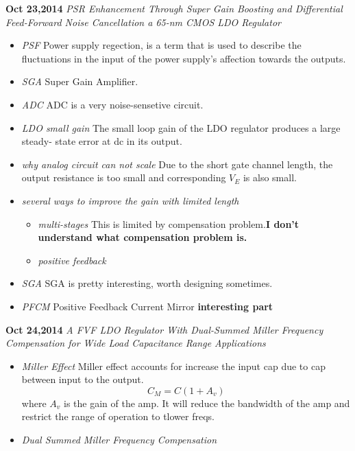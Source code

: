 \documentclass[]{article}
\begin{document}
\noindent \textbf{Oct 23,2014}
\textit{PSR Enhancement Through Super Gain Boosting and Differential Feed-Forward Noise Cancellation
        a 65-nm CMOS LDO Regulator}
\indent		\begin{itemize}
                \item \textit{PSF} Power supply regection, is a term that is used to describe the fluctuations
                        in the input of the power supply's affection towards the outputs. 
                \item \textit{SGA} Super Gain Amplifier.
                \item \textit{ADC} ADC is a very noise-sensetive circuit.
                \item \textit{LDO small gain} The small loop gain of the LDO regulator produces a large steady-
                        state error at dc in its output.
                \item \textit{why analog circuit can not scale} Due to the short gate channel length, the output
                        resistance is too small and corresponding $V_{E}$ is also small.
                \item \textit{several ways to improve the gain with limited length} 
                        \begin{itemize}
                            \item \textit{multi-stages} This is limited by compensation problem.\textbf{I don't 
                                understand what compensation problem is. }
                            \item \textit{positive feedback}
                        \end{itemize}
                \item \textit{SGA} SGA is pretty interesting, worth designing sometimes.
                \item \textit{PFCM} Positive Feedback Current Mirror \textbf{interesting part}
            \end{itemize}

\noindent \textbf{Oct 24,2014}
\textit{A FVF LDO Regulator With Dual-Summed Miller Frequency Compensation for Wide Load Capacitance 
        Range Applications}
\indent		\begin{itemize}
                \item \textit{Miller Effect} Miller effect accounts for increase the input cap due to cap between
                        input to the output.
                        \begin{equation}
                            C_{M}=C(1+A_{v})
                        \end{equation}
                        where $A_{v}$ is the gain of the amp. It will reduce the bandwidth of the amp and restrict
                        the range of operation to tlower freqs.
                \item \textit{Dual Summed Miller Frequency Compensation}
       		\end{itemize}
\end{document}
